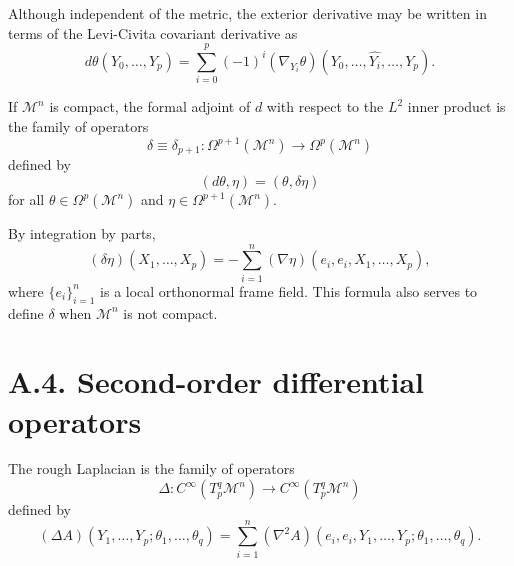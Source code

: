 \begin{remark}
\label{appa-rem-exterior-derivative-covariant-form}
Although independent of the metric, the exterior derivative may be written in terms of the Levi-Civita covariant derivative as
\[
d\theta(Y_0,\ldots,Y_p)=\sum_{i=0}^p (-1)^i (\nabla_{Y_i}\theta)(Y_0,\ldots,\widehat{Y_i},\ldots,Y_p).
\]
\end{remark}

\begin{definition}
\label{appa-def-formal-adjoint-exterior-derivative}
If \(\mathcal M^n\) is compact, the formal adjoint of \(d\) with respect to the \(L^2\) inner product is the family of operators
\[
\delta\equiv \delta_{p+1}:\Omega^{p+1}(\mathcal M^n)\to \Omega^p(\mathcal M^n)
\]
defined by
\[
(d\theta,\eta)=(\theta,\delta\eta)
\]
for all \(\theta\in \Omega^p(\mathcal M^n)\) and \(\eta\in \Omega^{p+1}(\mathcal M^n)\).
\end{definition}

\begin{remark}
\label{appa-rem-adjoint-exterior-derivative-covariant-form}
By integration by parts,
\[
(\delta\eta)(X_1,\ldots,X_p)
= - \sum_{i=1}^n (\nabla\eta)(e_i,e_i,X_1,\ldots,X_p),
\]
where \(\{e_i\}_{i=1}^n\) is a local orthonormal frame field. This formula also serves to define \(\delta\) when \(\mathcal M^n\) is not compact.
\end{remark}

\section*{A.4. Second-order differential operators}

\begin{definition}
\label{appa-def-rough-laplacian}
The rough Laplacian is the family of operators
\[
\Delta : C^\infty(T_p^q \mathcal M^n)\to C^\infty(T_p^q \mathcal M^n)
\]
defined by
\[
(\Delta A)(Y_1,\ldots,Y_p;\theta_1,\ldots,\theta_q)
= \sum_{i=1}^n (\nabla^2 A)(e_i,e_i,Y_1,\ldots,Y_p;\theta_1,\ldots,\theta_q).
\]
\end{definition}

